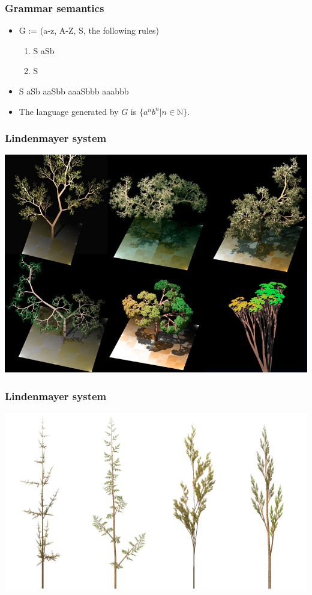 \documentclass[languages_and_machines.tex]{subfiles}
\begin{document}
\begin{frame}
  \frametitle{Grammar semantics}

  \begin{itemize}
  \item G := (a-z, A-Z, S, the following rules)
    \begin{enumerate}
    \item S \pro aSb
    \item S \pro \emptystr
    \end{enumerate}
    \pause

  \item S \pause \pro aSb \pause \pro aaSbb \pause \pro aaaSbbb \pause \pro aaabbb
    \pause

  \item The language generated by \(G\) is \pause \(\{a^nb^n | n \in \mathbb N\}\).
  \end{itemize}
\end{frame}

\begin{frame}
  \frametitle{Lindenmayer system}

  \includegraphics[width=1\textwidth]{L-system-1.jpg}
\end{frame}

\begin{frame}
  \frametitle{Lindenmayer system}

  \includegraphics[width=1\textwidth]{L-system-2.jpg}
\end{frame}
\end{document}

